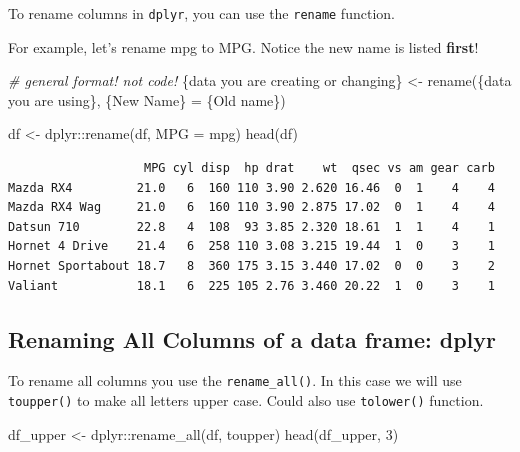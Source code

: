 \documentclass[
]{article}
\newenvironment{Shaded}{\begin{snugshade}}{\end{snugshade}}
\newcommand{\AttributeTok}[1]{\textcolor[rgb]{0.77,0.63,0.00}{#1}}
\newcommand{\CommentTok}[1]{\textcolor[rgb]{0.56,0.35,0.01}{\textit{#1}}}
\newcommand{\DecValTok}[1]{\textcolor[rgb]{0.00,0.00,0.81}{#1}}
\newcommand{\FunctionTok}[1]{\textcolor[rgb]{0.00,0.00,0.00}{#1}}
\newcommand{\NormalTok}[1]{#1}
\newcommand{\OtherTok}[1]{\textcolor[rgb]{0.56,0.35,0.01}{#1}}
\newcommand{\SpecialCharTok}[1]{\textcolor[rgb]{0.00,0.00,0.00}{#1}}
\begin{document}
To rename columns in \texttt{dplyr}, you can use the \texttt{rename}
function.

For example, let's rename mpg to MPG. Notice the new name is listed
\textbf{first}!

\begin{Shaded}
\begin{Highlighting}[]
\CommentTok{\# general format! not code!}
\NormalTok{\{data you are creating or changing\} }\OtherTok{\textless{}{-}} \FunctionTok{rename}\NormalTok{(\{data you are using\}, }
\NormalTok{                                        \{New Name\} }\OtherTok{=}\NormalTok{ \{Old name\})}
\end{Highlighting}
\end{Shaded}

\begin{Shaded}
\begin{Highlighting}[]
\NormalTok{df }\OtherTok{\textless{}{-}}\NormalTok{ dplyr}\SpecialCharTok{::}\FunctionTok{rename}\NormalTok{(df, }\AttributeTok{MPG =}\NormalTok{ mpg)}
\FunctionTok{head}\NormalTok{(df)}
\end{Highlighting}
\end{Shaded}

\begin{verbatim}
                   MPG cyl disp  hp drat    wt  qsec vs am gear carb
Mazda RX4         21.0   6  160 110 3.90 2.620 16.46  0  1    4    4
Mazda RX4 Wag     21.0   6  160 110 3.90 2.875 17.02  0  1    4    4
Datsun 710        22.8   4  108  93 3.85 2.320 18.61  1  1    4    1
Hornet 4 Drive    21.4   6  258 110 3.08 3.215 19.44  1  0    3    1
Hornet Sportabout 18.7   8  360 175 3.15 3.440 17.02  0  0    3    2
Valiant           18.1   6  225 105 2.76 3.460 20.22  1  0    3    1
\end{verbatim}

\hypertarget{renaming-all-columns-of-a-data-frame-dplyr}{%
\subsection{Renaming All Columns of a data frame:
dplyr}\label{renaming-all-columns-of-a-data-frame-dplyr}}

To rename all columns you use the \texttt{rename\_all()}. In this case
we will use \texttt{toupper()} to make all letters upper case. Could
also use \texttt{tolower()} function.

\begin{Shaded}
\begin{Highlighting}[]
\NormalTok{df\_upper }\OtherTok{\textless{}{-}}\NormalTok{ dplyr}\SpecialCharTok{::}\FunctionTok{rename\_all}\NormalTok{(df, toupper)}
\FunctionTok{head}\NormalTok{(df\_upper, }\DecValTok{3}\NormalTok{)}
\end{Highlighting}
\end{Shaded}
\end{document}
